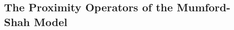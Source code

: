     

    \subsection{The Proximity Operators of the Mumford-Shah Model} %
    \label{sub:the_proximity_operators_of_the_mumford_shah_model}
        
